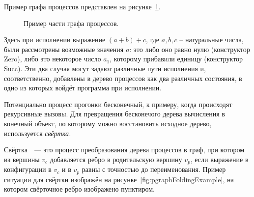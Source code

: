 Пример графа процессов представлен на рисунке~\ref{fig:pgraphExample}.
\begin{figure}[h!]
\center
{}

\caption{Пример части графа процессов.}
\label{fig:pgraphExample}
\end{figure}
Здесь при исполнении выражение $(a + b) + c$, где $a, b, c$ -- натуральные числа,
были рассмотрены возможные значения $a$: это либо оно равно нулю (конструктор Zero), либо это некоторое
число $a_1$, которому прибавили единицу (конструктор Succ). Эти два случая могут задают
различные пути исполнения и, соответственно, добавлены в дерево процессов как два различных состояния,
в одно из которых войдёт программа при исполнении.



Потенциально процесс прогонки бесконечный, к примеру, когда происходят рекурсивные вызовы.
Для превращения бесконечого дерева вычисления в конечный объект, по которому можно
восстановить исходное дерево, используется \emph{свёртка.}

Свёртка~~--- это процесс преобразования дерева процессов в граф, при котором
из вершины $v_c$ добавляется ребро в родительскую вершину $v_p$,
если выражение в конфигурации в $v_c$ и в $v_p$ равны с точностью до переименования.
Пример ситуации для свёртки изображён на рисунке~\ref{fig:pgraphFoldingExample},
на котором свёрточное ребро изображено пунктиром.

